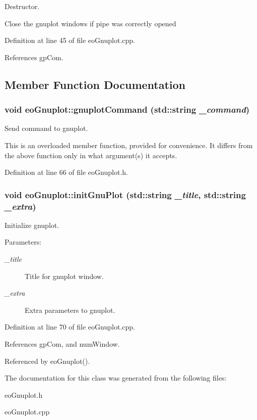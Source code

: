 Destructor. 

Close the gnuplot windows if pipe was correctly opened 

Definition at line 45 of file eo\-Gnuplot.cpp.

References gp\-Com.

\subsection{Member Function Documentation}
\subsubsection{\setlength{\rightskip}{0pt plus 5cm}void eo\-Gnuplot::gnuplot\-Command (std::string {\em \_\-command})\hspace{0.3cm}{\tt  [inline]}}\label{classeo_gnuplot_a4}


Send command to gnuplot. 

This is an overloaded member function, provided for convenience. It differs from the above function only in what argument(s) it accepts. 

Definition at line 66 of file eo\-Gnuplot.h.
\subsubsection{\setlength{\rightskip}{0pt plus 5cm}void eo\-Gnuplot::init\-Gnu\-Plot (std::string {\em \_\-title}, std::string {\em \_\-extra})\hspace{0.3cm}{\tt  [protected]}}\label{classeo_gnuplot_b0}


Initialize gnuplot. 

\begin{Desc}
\item[Parameters:]
\begin{description}
\item[{\em \_\-title}]Title for gnuplot window. \item[{\em \_\-extra}]Extra parameters to gnuplot. \end{description}
\end{Desc}


Definition at line 70 of file eo\-Gnuplot.cpp.

References gp\-Com, and num\-Window.

Referenced by eo\-Gnuplot().

The documentation for this class was generated from the following files:\begin{CompactItemize}
\item 
eo\-Gnuplot.h\item 
eo\-Gnuplot.cpp\end{CompactItemize}
